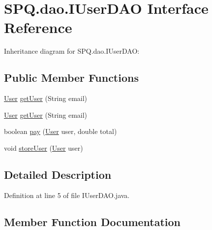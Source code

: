 \hypertarget{interface_s_p_q_1_1dao_1_1_i_user_d_a_o}{}\section{S\+P\+Q.\+dao.\+I\+User\+D\+AO Interface Reference}
\label{interface_s_p_q_1_1dao_1_1_i_user_d_a_o}


Inheritance diagram for S\+P\+Q.\+dao.\+I\+User\+D\+AO\+:
\subsection*{Public Member Functions}
\begin{DoxyCompactItemize}
\item 
\mbox{\hyperlink{class_s_p_q_1_1data_1_1_user}{User}} \mbox{\hyperlink{interface_s_p_q_1_1dao_1_1_i_user_d_a_o_ac53b137d5e0828058457e59fa70c2b95}{get\+User}} (String email)
\item 
\mbox{\hyperlink{class_s_p_q_1_1data_1_1_user}{User}} \mbox{\hyperlink{interface_s_p_q_1_1dao_1_1_i_user_d_a_o_ac53b137d5e0828058457e59fa70c2b95}{get\+User}} (String email)
\item 
boolean \mbox{\hyperlink{interface_s_p_q_1_1dao_1_1_i_user_d_a_o_a8a4257a186a80d5842e26aeb1140a402}{pay}} (\mbox{\hyperlink{class_s_p_q_1_1data_1_1_user}{User}} user, double total)
\item 
void \mbox{\hyperlink{interface_s_p_q_1_1dao_1_1_i_user_d_a_o_a286f084c9e920d1ce196658ab63ab0af}{store\+User}} (\mbox{\hyperlink{class_s_p_q_1_1data_1_1_user}{User}} user)
\end{DoxyCompactItemize}


\subsection{Detailed Description}


Definition at line 5 of file I\+User\+D\+A\+O.\+java.



\subsection{Member Function Documentation}
\mbox{\label{interface_s_p_q_1_1dao_1_1_i_user_d_a_o_ac53b137d5e0828058457e59fa70c2b95}} 
